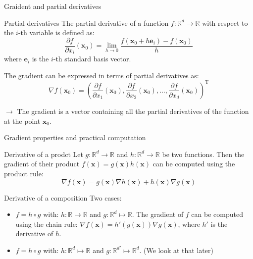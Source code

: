 \documentclass[aspectratio=1610]{beamer}
\begin{document}
\begin{frame}{Graident and partial derivatives}

  \begin{block}{Partial derivatives}
    The partial derivative of a function $f:\mathbb{R}^d \to \mathbb{R}$ with respect to the $i$-th variable is defined as:
    $$\frac{\partial f}{\partial x_i}(\mathbf{x}_0) = \lim_{h \to 0} \frac{f(\mathbf{x}_0 + h\mathbf{e}_i) - f(\mathbf{x}_0)}{h}$$
    where $\mathbf{e}_i$ is the $i$-th standard basis vector.
  \end{block}

  The gradient can be expressed in terms of partial derivatives as:
  $$\nabla f(\mathbf{x}_0) = \left( \frac{\partial f}{\partial x_1}(\mathbf{x}_0), \frac{\partial f}{\partial x_2}(\mathbf{x}_0), \ldots, \frac{\partial f}{\partial x_d}(\mathbf{x}_0) \right)^\mathrm{T}$$

  $\rightarrow$ The gradient is a vector containing all the partial derivatives of the function at the point $\mathbf{x}_0$.
\end{frame}


\begin{frame}{Gradient properties and practical computation}

  \begin{block}{Derivative of a prodct}
    Let $g:\mathbb{R}^d \to \mathbb{R}$ and $h:\mathbb{R}^d \to \mathbb{R}$ be two functions. Then the gradient of their product $f(\mathbf{x}) = g(\mathbf{x})h(\mathbf{x})$ can be computed using the product rule:
    $$\nabla f(\mathbf{x}) = g(\mathbf{x})\nabla h(\mathbf{x}) + h(\mathbf{x})\nabla g(\mathbf{x})$$
  \end{block}

  \begin{block}{Derivative of a composition}
    Two cases:
    \begin{itemize}
      \item $f=h\circ g$ with: $h:\mathbb{R}\mapsto\mathbb{R}$ and $g:\mathbb{R}^d\mapsto\mathbb{R}$. The gradient of $f$ can be computed using the chain rule:
        $\nabla f(\mathbf{x}) = h'(g(\mathbf{x}))\nabla g(\mathbf{x})$, where $h'$ is the derivative of $h$.
      \item $f=h\circ g$ with: $h:\mathbb{R}^d\mapsto\mathbb{R}$ and $g:\mathbb{R}^{d'}\mapsto\mathbb{R}^d$. (We look at that later)
    \end{itemize}
  \end{block}
\end{frame}
\end{document}
